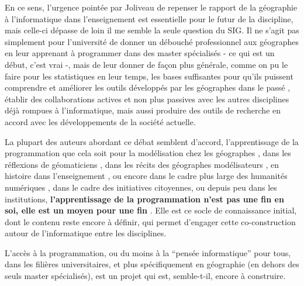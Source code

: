 
En ce sens, l'urgence pointée par Joliveau de repenser le rapport de la géographie à l'informatique dans l'enseignement est essentielle pour le futur de la discipline, mais celle-ci dépasse de loin il me semble la seule question du SIG. Il ne s'agit pas simplement pour l'université de donner un débouché professionnel aux géographes en leur apprenant à programmer dans des master spécialisés - ce qui est un début, c'est vrai -, mais de leur donner de façon plus générale, comme on pu le faire pour les statistiques en leur temps, les bases suffisantes pour qu'ils puissent comprendre et améliorer les outils développés par les géographes dans le passé , établir des collaborations actives et non plus passives avec les autres disciplines déjà rompues à l'informatique, mais aussi produire des outils de recherche en accord avec les développements de la société actuelle.

La plupart des auteurs abordant ce débat semblent d'accord, l'apprentissage de la programmation que cela soit pour la modélisation chez les géographes \autocite[64]{Banos2013}, dans les réflexions de géomaticiens \autocite{Joliveau2004}, dans les récits des géographes modélisateurs \autocites{LeBerre1987, Cuyala2014}, en histoire dans l'enseignement \autocite{Genet1993}, ou encore dans le cadre plus large des humanités numériques , dans le cadre des initiatives citoyennes, ou depuis peu dans les institutions, \textbf{l'apprentissage de la programmation n'est pas une fin en soi, elle est un moyen pour une fin} \autocite[67]{Deuff2014}. Elle est ce socle de connaissance initial, dont le contenu reste encore à définir, qui permet d'engager cette co-construction autour de l'informatique entre les disciplines.

L'accès à la programmation, ou du moins à la \enquote{pensée informatique} pour tous, dans les filières universitaires, et plus spécifiquement en géographie (en dehors des seuls master spécialisés), est un projet qui est, semble-t-il, encore à construire.



